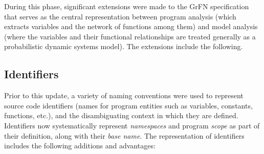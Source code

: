 \documentclass[article, 12pt, oneside]{memoir}
\begin{document}
During this phase, significant extensions were made to the GrFN
specification that serves as the central representation between program
analysis (which extracts variables and the network of functions among
them) and model analysis (where the variables and their functional
relationships are treated generally as a probabilistic dynamic systems
model). The extensions include the following.

\hypertarget{identifiers}{%
\subsection{Identifiers}\label{identifiers}}

Prior to this update, a variety of naming conventions were used to
represent source code identifiers (names for program entities such as
variables, constants, functions, etc.), and the disambiguating context
in which they are defined. Identifiers now systematically represent
\emph{namespaces} and program \emph{scope} as part of their definition,
along with their \emph{base name}. The representation of identifiers
includes the following additions and advantages:
\end{document}
